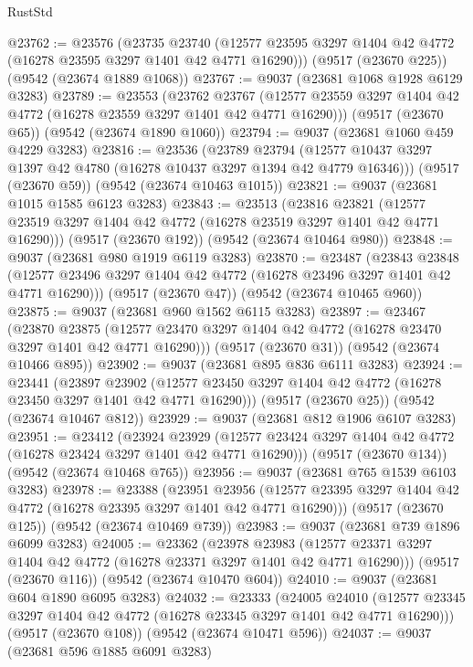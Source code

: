 \begin{lexlean}{RustStd}
\begin{coremodule}
@23762 := @23576
    (@23735
      @23740
      (@12577 @23595 @3297 @1404 @42 @4772 (@16278 @23595 @3297 @1401 @42 @4771 @16290)))
    (@9517 (@23670 @225))
    (@9542 (@23674 @1889 @1068))
@23767 := @9037 (@23681 @1068 @1928 @6129 @3283)
@23789 := @23553
    (@23762
      @23767
      (@12577 @23559 @3297 @1404 @42 @4772 (@16278 @23559 @3297 @1401 @42 @4771 @16290)))
    (@9517 (@23670 @65))
    (@9542 (@23674 @1890 @1060))
@23794 := @9037 (@23681 @1060 @459 @4229 @3283)
@23816 := @23536
    (@23789
      @23794
      (@12577 @10437 @3297 @1397 @42 @4780 (@16278 @10437 @3297 @1394 @42 @4779 @16346)))
    (@9517 (@23670 @59))
    (@9542 (@23674 @10463 @1015))
@23821 := @9037 (@23681 @1015 @1585 @6123 @3283)
@23843 := @23513
    (@23816
      @23821
      (@12577 @23519 @3297 @1404 @42 @4772 (@16278 @23519 @3297 @1401 @42 @4771 @16290)))
    (@9517 (@23670 @192))
    (@9542 (@23674 @10464 @980))
@23848 := @9037 (@23681 @980 @1919 @6119 @3283)
@23870 := @23487
    (@23843
      @23848
      (@12577 @23496 @3297 @1404 @42 @4772 (@16278 @23496 @3297 @1401 @42 @4771 @16290)))
    (@9517 (@23670 @47))
    (@9542 (@23674 @10465 @960))
@23875 := @9037 (@23681 @960 @1562 @6115 @3283)
@23897 := @23467
    (@23870
      @23875
      (@12577 @23470 @3297 @1404 @42 @4772 (@16278 @23470 @3297 @1401 @42 @4771 @16290)))
    (@9517 (@23670 @31))
    (@9542 (@23674 @10466 @895))
@23902 := @9037 (@23681 @895 @836 @6111 @3283)
@23924 := @23441
    (@23897
      @23902
      (@12577 @23450 @3297 @1404 @42 @4772 (@16278 @23450 @3297 @1401 @42 @4771 @16290)))
    (@9517 (@23670 @25))
    (@9542 (@23674 @10467 @812))
@23929 := @9037 (@23681 @812 @1906 @6107 @3283)
@23951 := @23412
    (@23924
      @23929
      (@12577 @23424 @3297 @1404 @42 @4772 (@16278 @23424 @3297 @1401 @42 @4771 @16290)))
    (@9517 (@23670 @134))
    (@9542 (@23674 @10468 @765))
@23956 := @9037 (@23681 @765 @1539 @6103 @3283)
@23978 := @23388
    (@23951
      @23956
      (@12577 @23395 @3297 @1404 @42 @4772 (@16278 @23395 @3297 @1401 @42 @4771 @16290)))
    (@9517 (@23670 @125))
    (@9542 (@23674 @10469 @739))
@23983 := @9037 (@23681 @739 @1896 @6099 @3283)
@24005 := @23362
    (@23978
      @23983
      (@12577 @23371 @3297 @1404 @42 @4772 (@16278 @23371 @3297 @1401 @42 @4771 @16290)))
    (@9517 (@23670 @116))
    (@9542 (@23674 @10470 @604))
@24010 := @9037 (@23681 @604 @1890 @6095 @3283)
@24032 := @23333
    (@24005
      @24010
      (@12577 @23345 @3297 @1404 @42 @4772 (@16278 @23345 @3297 @1401 @42 @4771 @16290)))
    (@9517 (@23670 @108))
    (@9542 (@23674 @10471 @596))
@24037 := @9037 (@23681 @596 @1885 @6091 @3283)

\end{coremodule}
\end{lexlean}
